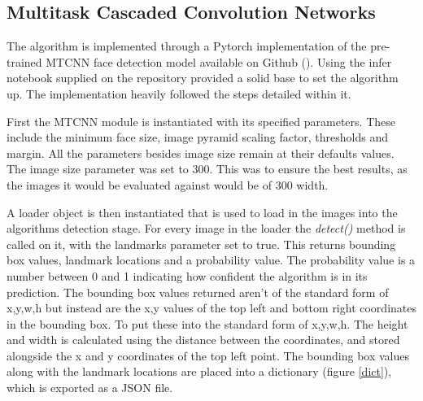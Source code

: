 \documentclass{l4proj}
\begin{document}
\subsection{Multitask Cascaded Convolution Networks}
The algorithm is implemented through a Pytorch implementation of the pre-trained MTCNN face detection model available on Github (\cite{mtcnngit}). Using the infer notebook supplied on the repository provided a solid base to set the algorithm up. The implementation heavily followed the steps detailed within it.

First the MTCNN module is instantiated with its specified parameters. These include the minimum face size, image pyramid scaling factor, thresholds and margin. All the parameters besides image size remain at their defaults values. The image size parameter was set to 300. This was to ensure the best results, as the images it would be evaluated against would be of 300 width.

A loader object is then instantiated that is  used to load in the images into the algorithms detection stage. For every image in the loader the \textit{detect()} method is called on it, with the landmarks parameter set to true. This returns bounding box values, landmark locations and a probability value. The probability value is a number between 0 and 1 indicating how confident the algorithm is in its prediction. The bounding box values returned aren't of the standard form of x,y,w,h but instead are the x,y values of the top left and bottom right coordinates in the bounding box. To put these into the standard form of x,y,w,h. The height and width is calculated using the distance between the coordinates, and stored alongside the x and y coordinates of the top left point. The bounding box values along with the landmark locations are placed into a dictionary (figure \ref{dict}), which is exported as a JSON file.
\end{document}
